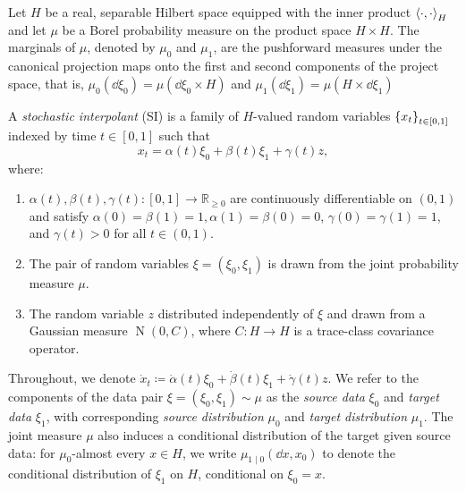 Let \(H\) be a real, separable Hilbert space equipped with the inner product \(\ev{\cdot, \cdot}_{H}\) and let \(\mu\) be a Borel probability measure on the product space \(H \times H\). The marginals of \(\mu\), denoted by \(\mu_{0}\) and \(\mu_{1}\), are the pushforward measures under the canonical projection maps onto the first and second components of the project space, that is, \(\mu_{0}(\dd{\xi_{0}}) = \mu(\dd{\xi_{0}}\times H)\) and \(\mu_{1}(\dd{\xi_{1}}) = \mu(H \times \dd{\xi_{1}})\)


\begin{definition}\label{dfn:stochint}
  A \textit{stochastic interpolant} (SI) is a family of \(H\)-valued random variables \(\qty{x_{t}}_{t \in [0, 1]}\) indexed by time \(t \in [0, 1]\) such that
  \[
    x_{t} = \alpha(t) \xi_{0} + \beta(t) \xi_{1} + \gamma(t)z,
  \]
  where:
  \begin{enumerate}
    \item \(\alpha(t), \beta(t), \gamma(t) : [0, 1] \to \mathbb{R}_{\geq 0}\) are continuously differentiable on \((0, 1)\) and satisfy \(\alpha(0) = \beta(1) = 1, \alpha(1) = \beta(0) = 0\), \(\gamma(0) = \gamma(1) = 1\), and \(\gamma(t) > 0\) for all \(t \in (0, 1)\).
    \item The pair of random variables \(\xi = (\xi_0, \xi_1)\) is drawn from the joint probability measure \(\mu\).
    \item The random variable \(z\) distributed independently of \(\xi\) and drawn from a Gaussian measure \(\operatorname{N}(0, C)\), where \(C : H\to H\) is a trace-class covariance operator.
  \end{enumerate}
\end{definition}

Throughout, we denote \(\dot{x}_{t}\coloneqq \dot{\alpha}(t) \xi_{0} + \dot{\beta}(t) \xi_{1} + \dot{\gamma}(t) z\). We refer to the components of the data pair \(\xi = (\xi_{0}, \xi_{1}) \sim \mu\) as the \textit{source data} \(\xi_{0}\) and \textit{target data} \(\xi_{1}\), with corresponding \textit{source distribution} \(\mu_{0}\) and \textit{target distribution} \(\mu_{1}\). The joint measure \(\mu\) also induces a conditional distribution of the target given source data: for \(\mu_{0}\)-almost every \(x \in H\), we write \(\mu_{1 \mid 0}(\dd{x}, x_{0})\) to denote the  conditional distribution of \(\xi_{1}\) on \(H\), conditional on \(\xi_{0} = x\).

